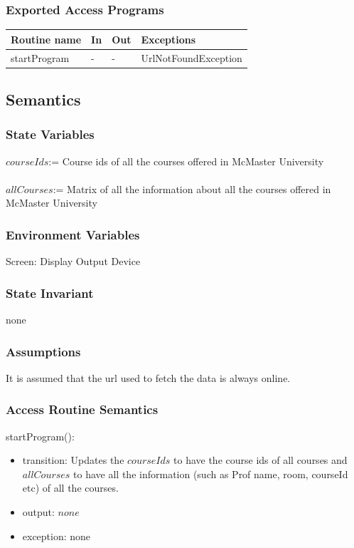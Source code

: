 \documentclass[11pt, oneside]{article}
\begin{document}
\subsubsection* {Exported Access Programs}
\begin{tabular}{| l | l | l | l |}
\hline
\textbf{Routine name} & \textbf{In} & \textbf{Out} & \textbf{Exceptions}\\
\hline
startProgram & - & - & UrlNotFoundException \\
\hline

\end{tabular}
\subsection* {Semantics}
\subsubsection* {State Variables}
$courseIds$:= Course ids of all the courses offered in McMaster University \\ \\
$allCourses$:= Matrix of all the information about all the courses offered in McMaster University
\subsubsection*{Environment Variables}
Screen: Display Output Device \\

\subsubsection* {State Invariant}
none
\subsubsection* {Assumptions}
It is assumed that the url used to fetch the data is always online. 
\subsubsection* {Access Routine Semantics}
startProgram():
\begin{itemize}
\item transition: Updates the $courseIds$ to have the course ids of all courses and $allCourses$ to have all the information (such as Prof name, room, courseId etc) of all the courses.
\item output: $none$
\item exception:
 none
\end{itemize}
\end{document}
